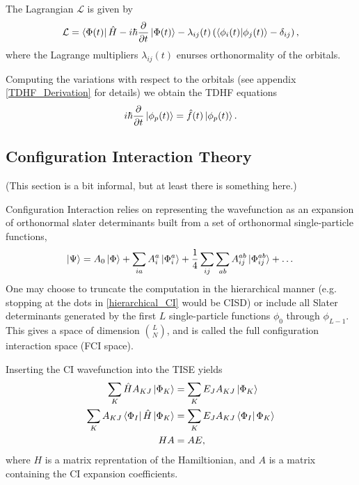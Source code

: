 \documentclass[aip,jcp,reprint,floatfix]{revtex4-1}
\begin{document}
The Lagrangian $\mathcal{L}$ is given by 
\begin{equation}
    \mathcal{L} = \bra{\Phi(t)} \hat{H} - i\hbar \frac{\partial}{\partial t} \ket{\Phi(t)} 
    - \lambda_{ij}(t)\left(\braket{\phi_i(t)|\phi_j(t)} - \delta_{ij}\right),
\end{equation}
where the Lagrange multipliers $\lambda_{ij}(t)$ enurses orthonormality of the orbitals. 

Computing the variations  with respect to the orbitals (see appendix \ref{TDHF_Derivation} for details) we obtain the TDHF equations 
\begin{equation}
    i \hbar \frac{\partial}{\partial t} \ket{\phi_p(t)} = \hat{f}(t) \ket{\phi_p(t)}.
\end{equation}

\subsection{Configuration Interaction Theory}

(This section is a bit informal, but at least there is something here.)

Configuration Interaction relies on representing the wavefunction as an expansion of orthonormal slater determinants built from a set of orthonormal single-particle functions,
\begin{equation}
    \label{hierarchical_CI}
    \ket{\Psi} = A_0\ket{\Phi} + \sum_{ia}A^a_i\ket{\Phi^a_i} 
    + \frac{1}{4}\sum_{ij} \sum_{ab} A^{ab}_{ij}\ket{\Phi^{ab}_{ij}} + \dots
\end{equation}
One may choose to truncate the computation in the hierarchical manner (e.g. stopping at the dots in \autoref{hierarchical_CI} would be CISD) or include all Slater determinants generated by the first $L$ single-particle functions $\phi_0$ through $\phi_{L-1}$. This gives a space of dimension $\binom{L}{N}$, and is called the full configuration interaction space (FCI space).

Inserting the CI wavefunction into the TISE yields
\begin{align}
    \sum_{K}\hat{H} A_{KJ} \ket{\Phi_K} &= \sum_{K} E_J A_{KJ} \ket{\Phi_K} \\
    \sum_{K} A_{KJ} \bra{\Phi_I}\hat{H} \ket{\Phi_K} &= \sum_{K} E_J A_{KJ} \bra{\Phi_I}\Phi_K\rangle \\
    HA &= AE,
\end{align}
where $H$ is a matrix reprentation of the Hamiltionian, and $A$ is a matrix containing the CI expansion coefficients.
\end{document}

